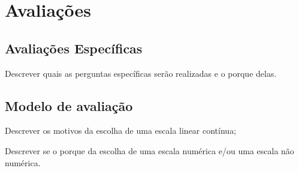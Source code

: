 \section{Avaliações}\label{sec:avalia}
\subsection{Avaliações Específicas}\label{subsec:avaliaspec}
Descrever quais as perguntas específicas serão realizadas e o porque delas.

\subsection{Modelo de avaliação}\label{subsec:modavalia}
Descrever os motivos da escolha de uma escala linear contínua;

Descrever se o porque da escolha de uma escala numérica e/ou uma escala não numérica.
